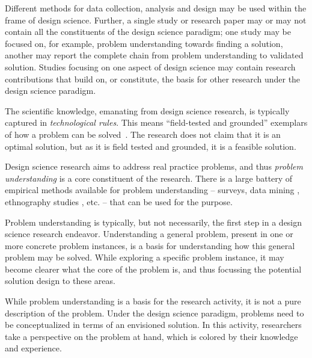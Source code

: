\documentclass[graybox]{svmult}
\begin{document}
Different methods for data collection, analysis and design may be used within the frame of design science. Further, a single study or research paper may or may not contain all the constituents of the design science paradigm; one study may be focused on, for example,  problem understanding towards finding a solution, another may report the complete chain from problem understanding to validated solution. Studies focusing on one aspect of design science may contain research contributions that build on, or constitute, the basis for other research under the design science paradigm.

The scientific knowledge, emanating from design science research, is typically captured in \emph{technological rules}. This means ``field-tested and grounded'' exemplars of how a problem can be solved~\cite{van_aken_management_2004}. The research does not claim that it is an optimal solution, but as it is field tested and grounded, it is a feasible solution.

Design science research aims to address real practice problems, and thus \emph{problem understanding} is a core constituent of the research. There is a large battery of empirical methods available for problem understanding -- surveys, data mining \cite{MenziesDataMining2016}, ethnography studies \cite{SharpEthnography2016}, etc. -- that can be used for the purpose. 

Problem understanding is typically, but not necessarily, the first step in a design science research endeavor. Understanding a general problem, present in one or more concrete problem instances, is a basis for understanding how this general problem may be solved.  While exploring a specific problem instance,   it may become clearer what the core of the problem is, and thus focussing the potential solution design to these areas. 

While problem understanding is a basis for the research activity, it is not a pure description of the problem. Under the design science paradigm, problems need to be conceptualized in terms of an envisioned solution. In this activity, researchers take a perspective on the problem at hand, which is colored by their knowledge and experience. 
\end{document}
